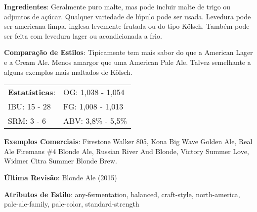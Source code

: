 \textbf{Ingredientes}: Geralmente puro malte, mas pode incluir malte de trigo ou adjuntos de açúcar. Qualquer variedade de lúpulo pode ser usada. Levedura pode ser americana limpa, inglesa levemente frutada ou do tipo Kölsch. Também pode ser feita com levedura lager ou acondicionada a frio.

\textbf{Comparação de Estilos}: Tipicamente tem mais sabor do que a American Lager e a Cream Ale. Menos amargor que uma American Pale Ale. Talvez semelhante a alguns exemplos mais maltados de Kölsch.

\begin{tabular}{@{}p{35mm}p{35mm}@{}}
  \textbf{Estatísticas}: & OG: 1,038 - 1,054 \\
  IBU: 15 - 28  & FG: 1,008 - 1,013  \\
  SRM: 3 - 6  & ABV: 3,8\% - 5,5\%
\end{tabular}

\textbf{Exemplos Comerciais}: Firestone Walker 805, Kona Big Wave Golden Ale, Real Ale Firemans \#4 Blonde Ale, Russian River Aud Blonde, Victory Summer Love, Widmer Citra Summer Blonde Brew.

\textbf{Última Revisão}: Blonde Ale (2015)

\textbf{Atributos de Estilo}: any-fermentation, balanced, craft-style, north-america, pale-ale-family, pale-color, standard-strength
